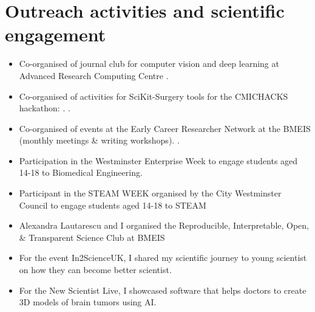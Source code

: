 \documentclass{mycv}
\begin{document}
\section{Outreach activities and scientific engagement}
\begin{itemize}
\item Co-organised of journal club for computer vision and deep learning at Advanced Research Computing Centre .
\item Co-organised of activities for SciKit-Surgery tools for the CMICHACKS hackathon: \href{https://cmic-ucl.github.io/CMICHACKS//}{\faExternalLink*}. .
\item Co-organised of events at the Early Career Researcher Network at the BMEIS (monthly meetings \& writing workshops). .
\item Participation in the Westminster Enterprise Week to engage students aged 14-18 to Biomedical Engineering. 
\item Participant in the STEAM WEEK organised by the City Westminster Council to engage students aged 14-18 to STEAM \href{https://twitter.com/_mxochicale/status/1374407825607200769}{\faTwitter} 
\item Alexandra Lautarescu and I organised the Reproducible, Interpretable, Open, \& Transparent Science Club at BMEIS 
\item For the event In2ScienceUK, I shared my scientific journey to young scientist on how they can become better scientist.  
\item For the New Scientist Live, I showcased software that helps doctors to create 3D models of brain tumors using AI. 



\end{itemize}
\end{document}
